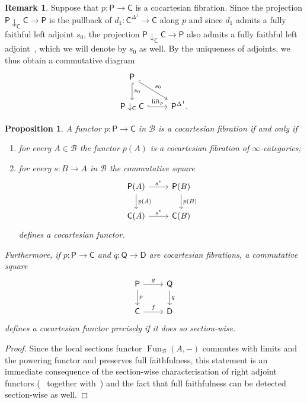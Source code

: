\documentclass[reqno]{amsart}
\numberwithin{equation}{subsection}
\theoremstyle{plain}
\newtheorem{proposition}[equation]{Proposition}
\theoremstyle{definition}
\newtheorem{remark}[equation]{Remark}
\let\scr=\mathcal
\def\BB{\scr B}
\DeclareMathOperator{\Fun}{Fun}
\DeclareMathOperator{\lift}{lift}
\newcommand{\I}[1]{\mathsf{#1}}
\newcommand{\Comma}[3]{{#1}\downarrow_{#2}{#3}}
\begin{document}
\begin{remark}
	\label{rem:equivalencesAreCocartesian}
	Suppose that $p\colon \I{P}\to\I{C}$ is a cocartesian fibration. Since the projection $\Comma{\I{P}}{\I{C}}{\I{C}}\to\I{P}$ is the pullback of $d_1\colon \I{C}^{\Delta^1}\to\I{C}$ along $p$ and since $d_1$ admits a fully faithful left adjoint $s_0$, the projection $\Comma{\I{P}}{\I{C}}{\I{C}}\to\I{P}$ also admits a fully faithful left adjoint~\cite[Lemma~6.3.9]{Martini2021a}, which we will denote by $s_0$ as well. By the uniqueness of adjoints, we thus obtain a commutative diagram
	\begin{equation*}
	\begin{tikzcd}
	\I{P} \arrow[d, "s_0", hookrightarrow] \arrow[dr, "s_0", hookrightarrow]& \\
	\Comma{\I{P}}{\I{C}}{\I{C}}\arrow[r, "\lift_p", hookrightarrow] & \I{P}^{\Delta^1}. 
	\end{tikzcd}
	\end{equation*}
\end{remark}

\begin{proposition}
	\label{prop:externalCharacterisationCocartesian}
	A functor $p\colon \I{P}\to\I{C}$ in $\BB$ is a cocartesian fibration if and only if
	\begin{enumerate}
	\item for every $A\in \BB$ the functor $p(A)$ is a cocartesian fibration of $\infty$-categories;
	\item for every $s\colon B\to A$ in $\BB$ the commutative square
	\begin{equation*}
		\begin{tikzcd}
		\I{P}(A)\arrow[r, "s^\ast"]\arrow[d, "p(A)"] & \I{P}(B)\arrow[d, "p(B)"]\\
		\I{C}(A)\arrow[r, "s^\ast"] &\I{C}(B)
		\end{tikzcd}
	\end{equation*}
	defines a cocartesian functor.
	\end{enumerate}
	Furthermore, if $p\colon \I{P}\to \I{C}$ and $q\colon \I{Q}\to\I{D}$ are cocartesian fibrations, a commutative square
	\begin{equation*}
		\begin{tikzcd}
			\I{P}\arrow[d, "p"]\arrow[r, "g"] & \I{Q}\arrow[d, "q"]\\
			\I{C}\arrow[r, "f"] & \I{D}
		\end{tikzcd}
	\end{equation*}
	defines a cocartesian functor precisely if it does so section-wise.
\end{proposition}
\begin{proof}
	Since the local sections functor $\Fun_{\BB}(A,-)$ commutes with limits and the powering functor and preserves full faithfulness, this statement is an immediate consequence of the section-wise characterisation of right adjoint functors (~\cite[Proposition~3.2.8]{Martini2021a} together with~\cite[Remark~3.2.9]{Martini2021a}) and the fact that full faithfulness can be detected section-wise as well.
\end{proof}
\end{document}
